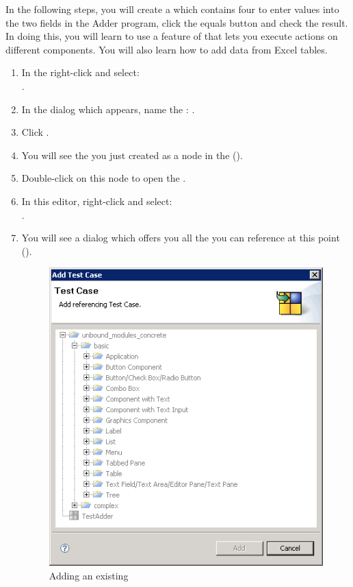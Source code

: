 In the following steps, you will create a \gdcase{} which  contains four \gdcases{} to enter values into the two fields in the Adder program, click the equals button and check the result. In doing this, you will learn to use a feature of \app{} that lets you execute actions on different components. You will also learn how to add data from Excel tables. 

\begin{enumerate}
\item In the \gdtestcasebrowser{} right-click and select:\\ . 
\item In the dialog which appears, name the \gdcase{}: .
 \item Click . 
 \item You will see the \gdcase{} you just created as a node in the \gdtestcasebrowser{} ().
\item Double-click on this node to open the \gdtestcaseeditor{}. 
\item In this editor, right-click and select:\\ .
\item You will see a dialog which offers you all the \gdcases{} you can reference at this point ().

\begin{figure}[h]
\begin{center}
\includegraphics{Tutorials/PS/TutAddExistingTestCase}
\caption{Adding an existing \gdcase{}}
\label{TutAddExistingTestCase}
\end{center}
\end{figure}


\end{enumerate}

